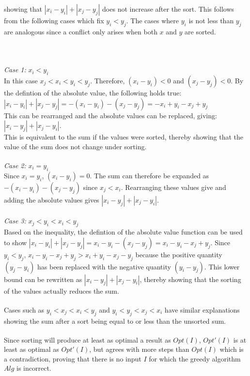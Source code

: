 \documentclass[12pt]{article}
\begin{document}
showing that $|x_i - y_i| + |x_j - y_j|$ does not increase after the sort.  This
follows from the following cases which fix $y_i < y_j$.  The cases where
$y_i$ is not less than $y_j$ are analogous since a conflict only arises when both $x$ and $y$
are sorted.\\\\\\\\  
\textit{Case 1:} $x_i < y_i$\\
In this case $x_j < x_i < y_i < y_j$.  Therefore, $(x_i - y_i) < 0$
and $(x_j - y_j) < 0$.  By the defintion of the absolute value, the following holds
true:\\
$|x_i - y_i| + |x_j - y_j| = -(x_i - y_i) - (x_j - y_j) = -x_i + y_i - x_j + y_j$\\
This can be rearranged and the absolute values can be replaced, giving: $|x_i - y_j| + |x_j - y_i|$.\\
This is equivalent to the sum if the values were sorted, thereby showing that the value
of the sum does not change under sorting.\\\\
\textit{Case 2:} $x_i = y_i$\\
Since $x_i = y_i$, $(x_i - y_i) = 0$. The sum can therefore be expanded as
$-(x_i - y_i) - (x_j - y_j)$ since $x_j < x_i$.  Rearranging these values
give and adding the absolute values gives $|x_i - y_j| + |x_j - y_i|$.\\\\ 
\textit{Case 3:} $x_j < y_i < x_i < y_j$\\
Based on the inequality, the defintion of the absolute value function can be used to show
$|x_i - y_i| + |x_j - y_j| = x_i - y_i - (x_j - y_j) = x_i - y_i - x_j + y_j$.  Since 
$y_i < y_j$, $x_i - y_i - x_j + y_j > x_i + y_i - x_j - y_j$ because the positive quantity
$(y_j - y_i)$ has been replaced with the negative quantity $(y_i - y_j)$.  This lower bound
can be rewritten as $|x_i - y_j| + |x_j - y_i|$, thereby showing that the sorting of the
values actually reduces the sum.\\\\
Cases such as $y_i < x_j < x_i < y_j$ and $y_i < y_j < x_j < x_i$ have similar explanations
showing the sum after a sort being equal to or less than the unsorted sum.\\\\
Since sorting will produce at least as optimal a result as $Opt(I)$, $Opt'(I)$ is at least
as optimal as $Opt'(I)$, but agrees with more steps than $Opt(I)$ which is a contradiction,
proving that there is no input $I$ for which the greedy algorithm $Alg$ is incorrect.     
\end{document}
